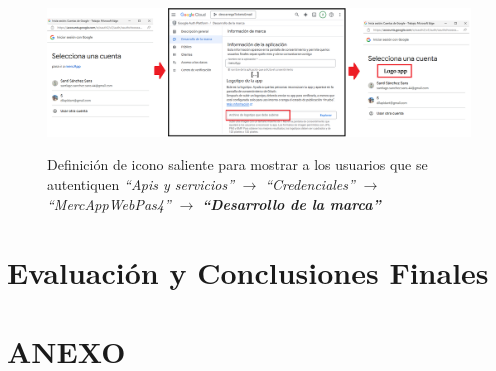 \documentclass[a4paper,12pt]{report}
\begin{document}
	\FloatBarrier
	\setlength{\belowcaptionskip}{3pt}
	\begin{figure}[H]
		\centering
		\caption{Definición de icono saliente para mostrar a los usuarios que se autentiquen \textit{``Apis y servicios''} $\rightarrow$ \textit{``Credenciales''} $\rightarrow$ \textit{``MercAppWebPas4''} $\rightarrow$ \textbf{\textit{``Desarrollo de la marca''}}}
		\includegraphics[width=1\linewidth]{img/mercAppLogo}
		\label{fig:mercAppLogo}
	\end{figure}
	\FloatBarrier
	
	
	
	
	
	\chapter{Evaluación y Conclusiones Finales} %
	

	
	
	
	

	
	
	
	
	
	
	
	
	
	
	
	
	
	
	
	
	
	
	
	
	
	
	
	
	
	
	
	
	
	
	
	
	
	
	
	
	
	
	
	
	\chapter{ANEXO}
	\label{chap:anexo} %
		
\end{document}
